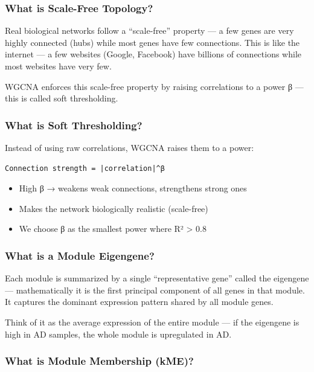 \documentclass[
]{article}
\providecommand{\tightlist}{%
  \setlength{\itemsep}{0pt}\setlength{\parskip}{0pt}}
\begin{document}
\subsubsection{What is Scale-Free
Topology?}\label{what-is-scale-free-topology}

Real biological networks follow a ``scale-free'' property --- a few
genes are very highly connected (hubs) while most genes have few
connections. This is like the internet --- a few websites (Google,
Facebook) have billions of connections while most websites have very
few.

WGCNA enforces this scale-free property by raising correlations to a
power β --- this is called soft thresholding.

\subsubsection{What is Soft
Thresholding?}\label{what-is-soft-thresholding}

Instead of using raw correlations, WGCNA raises them to a power:

\begin{verbatim}
Connection strength = |correlation|^β
\end{verbatim}

\begin{itemize}
\tightlist
\item
  High β → weakens weak connections, strengthens strong ones
\item
  Makes the network biologically realistic (scale-free)
\item
  We choose β as the smallest power where R² \textgreater{} 0.8
\end{itemize}

\subsubsection{What is a Module
Eigengene?}\label{what-is-a-module-eigengene}

Each module is summarized by a single ``representative gene'' called the
eigengene --- mathematically it is the first principal component of all
genes in that module. It captures the dominant expression pattern shared
by all module genes.

Think of it as the average expression of the entire module --- if the
eigengene is high in AD samples, the whole module is upregulated in AD.

\subsubsection{What is Module Membership
(kME)?}\label{what-is-module-membership-kme}
\end{document}
